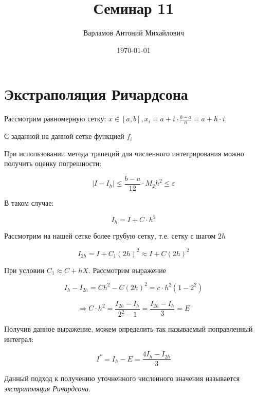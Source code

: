 \documentclass[10pt,a4paper]{article}
\title{Семинар 11}
\date{\today}
\author{Варламов Антоний Михайлович}
\begin{document}
	\maketitle
	
	\section{Экстраполяция Ричардсона}
	
	Рассмотрим равномерную сетку: $x \in \left[a, b\right], x_{i} = a + i \cdot
	\frac{b - a}{n} = a + h\cdot i$
	
	С заданной на данной сетке функцией $f_{i}$
	
	При использовании метода трапеций для численного интегрирования можно 
	получить оценку погрешности:
	
	\begin{equation}
		\left|I - I_{h}\right| \leqslant \frac{b - a}{12}\cdot M_{2}h^{2} 
		\leqslant \varepsilon
	\end{equation}
	
	В таком случае:
	
	\begin{equation}
		I_{h} = I + C\cdot h^2
	\end{equation}
	
	Рассмотрим на нашей сетке более грубую сетку, т.е. сетку с шагом $2h$
	
	\begin{equation}
		I_{2h} = I + C_{1}\left(2h\right)^{2} \approx I + C\left(2h\right)^{2}
	\end{equation}
	
	При условии $C_{1} \approx C + hX$. Рассмотрим выражение
	
	\begin{equation}
		I_{h} - I_{2h} = Ch^{2} - C\left(2h\right)^{2} = c\cdot h^{2}
		\left(1 - 2^{2}\right)
	\end{equation}
	
	\begin{equation}
		\Rightarrow C\cdot h^{2} = \frac{I_{2h} - I_{h}}{2^2 - 1} = 
		\frac{I_{2h} - I_{h}}{3} = E
	\end{equation}
	
	Получив данное выражение, можем определить так называемый поправленный 
	интеграл:
	
	\begin{equation}
		I^{*} = I_{h} - E = \frac{4I_{h} - I_{2h}}{3}
	\end{equation}
	
	Данный подход к получению уточненного численного значения называется 
	\textit{экстраполяция Ричардсона}.
	
\end{document}
